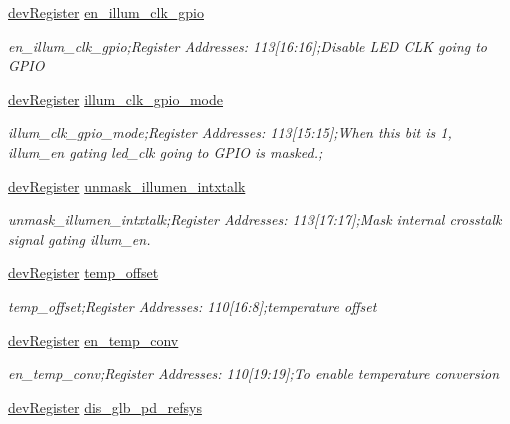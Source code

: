 \begin{DoxyCompactItemize}
\mbox{\hyperlink{classdev_register}{dev\+Register}} \mbox{\hyperlink{class_o_p_t3101_registers_ae4e24dda1b61159e4352356d589478e6}{en\+\_\+illum\+\_\+clk\+\_\+gpio}}
\begin{DoxyCompactList}\small\item\em en\+\_\+illum\+\_\+clk\+\_\+gpio;Register Addresses\+: 113\mbox{[}16\+:16\mbox{]};Disable L\+ED C\+LK going to G\+P\+IO \end{DoxyCompactList}\item 
\mbox{\hyperlink{classdev_register}{dev\+Register}} \mbox{\hyperlink{class_o_p_t3101_registers_a8179b5fcd502e8d457cffefa3d29fbfa}{illum\+\_\+clk\+\_\+gpio\+\_\+mode}}
\begin{DoxyCompactList}\small\item\em illum\+\_\+clk\+\_\+gpio\+\_\+mode;Register Addresses\+: 113\mbox{[}15\+:15\mbox{]};When this bit is \textquotesingle{}1\textquotesingle{}, illum\+\_\+en gating led\+\_\+clk going to G\+P\+IO is masked.; \end{DoxyCompactList}\item 
\mbox{\hyperlink{classdev_register}{dev\+Register}} \mbox{\hyperlink{class_o_p_t3101_registers_abfff16e44f89b0db5bffbf56fb955bfb}{unmask\+\_\+illumen\+\_\+intxtalk}}
\begin{DoxyCompactList}\small\item\em unmask\+\_\+illumen\+\_\+intxtalk;Register Addresses\+: 113\mbox{[}17\+:17\mbox{]};Mask internal crosstalk signal gating illum\+\_\+en. \end{DoxyCompactList}\item 
\mbox{\hyperlink{classdev_register}{dev\+Register}} \mbox{\hyperlink{class_o_p_t3101_registers_a26bebaed274a28fd3531af38d2e18ac1}{temp\+\_\+offset}}
\begin{DoxyCompactList}\small\item\em temp\+\_\+offset;Register Addresses\+: 110\mbox{[}16\+:8\mbox{]};temperature offset \end{DoxyCompactList}\item 
\mbox{\hyperlink{classdev_register}{dev\+Register}} \mbox{\hyperlink{class_o_p_t3101_registers_afe90c6926f0809ce3d3f7ce5949a21a5}{en\+\_\+temp\+\_\+conv}}
\begin{DoxyCompactList}\small\item\em en\+\_\+temp\+\_\+conv;Register Addresses\+: 110\mbox{[}19\+:19\mbox{]};To enable temperature conversion \end{DoxyCompactList}\item 
\mbox{\hyperlink{classdev_register}{dev\+Register}} \mbox{\hyperlink{class_o_p_t3101_registers_a3483f13e070b756c7cb4bb1276e12f1b}{dis\+\_\+glb\+\_\+pd\+\_\+refsys}}

\end{DoxyCompactItemize}
